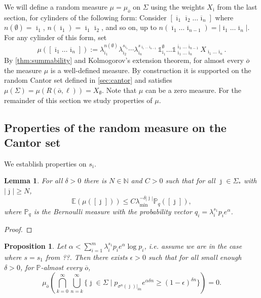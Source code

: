 \documentclass[12pt,]{article}
\newtheorem{proposition}[theorem]{Proposition}
\newtheorem{lemma}[theorem]{Lemma}
\theoremstyle{definition}
\theoremstyle{remark}
\renewcommand{\Bbb}[1]{\mathbb{#1}}
\newcommand{\bbE}{{\Bbb E}}
\newcommand{\bbN}{{\Bbb N}}         %
\newcommand{\bbP}{{\Bbb P}}
\newcommand{\0}{\mathbf{0}}
\renewcommand{\le}{\leq}
\renewcommand{\ge}{\geq}
\newcommand{\bi}{{\overline {\imath}}}
\newcommand{\bj}{{\overline  {\jmath}}}
\newcommand{\bo}{{\overline o}}
\begin{document}
We will define a random measure $\mu=\mu_\bo$ on $\Sigma$ using the weights $X_\bi$ from the last
section, for cylinders of the following form: Consider $[\bi_1\bi_2\dots\bi_n]$ where
$n(\emptyset)=\bi_1$, $n(\bi_1)=\bi_1\bi_2$, and so on, up to $n(\bi_1\dots\bi_{n-1})=|\bi_1\dots
\bi_n|$. For any cylinder of this form, set
\[
  \mu([\bi_1\dots\bi_n]):=\lambda_{\bi_1}^{n(\emptyset)}\lambda_{\bi_2}^{s_{{\bi_1}}}\cdots
  \lambda_{\bi_n}^{s_{\bi_1\dots\bi_{n-1}}}\mathbb 1_{\bi_1}^{\emptyset} \dots \mathbb
  1_{\bi_{1}\dots \bi_n}^{\bi_1\dots \bi_{n-1}}X_{\bi_1\dots \bi_n}.
\]
By \cref{thm:summability} and Kolmogorov's extension theorem, for almost every $\bo$ the measure
$\mu$ is a well-defined measure. By construction it is supported on the random Cantor set defined in
\cref{sec:cantor} and satisfies $\mu(\Sigma)=\mu(R(\bo, \ell))=X_\emptyset$. Note that $\mu$ can be
a zero measure. For the remainder of this section we study properties of $\mu$.


\subsection{Properties of the random measure on the Cantor set}

We establish properties on $s_{\bi}$.

\begin{lemma}
  For all $\delta>0$ there is $N\in \bbN$ and $C>0$ such that for all $\bj\in \Sigma_*$ with $|\bj|\ge N$,
  \[
    \bbE(\mu([\bj]))\le C \lambda_{\min}^{-\delta |\bj|}\bbP_q([\bj]),
  \]
  where $\bbP_q$ is the Bernoulli measure with the probability vector $q_i=\lambda_i^{s_1}p_ie^\alpha$.
\end{lemma}

\begin{proof}

\end{proof}

\begin{proposition}\label{thm:rightsubset}
  Let $\alpha<\sum_{i=1}^m \lambda_i^{s_1}p_ie^\alpha\log p_i$, i.e. assume we are in the case where
  $s=s_1$ from ??. Then there exists $\epsilon>0$ such that for all small enough $\delta>0$, for $\bbP$-almost every $\bo$,
  \[
    \mu_{\bo}\left( \bigcap_{k=0}^\infty \bigcup_{n=k}^\infty \{\bj\in \Sigma \mid p_{\sigma^n(\bj)|_{\delta n}}e^{\alpha \delta n}\ge (1-\epsilon)^{\delta n} \} \right)=0.
  \]

\end{proposition}
\end{document}
